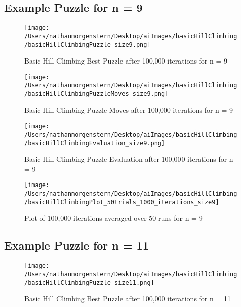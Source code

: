 \documentclass{report}
\begin{document}
\subsection{Example Puzzle for n = 9}
	
	\begin{figure}[H]
	\centering
	\texttt{[image: /Users/nathanmorgenstern/Desktop/aiImages/basicHillClimbing/basicHillClimbingPuzzle\_size9.png]}
	\caption{Basic Hill Climbing Best Puzzle after 100,000 iterations for n = 9} 
	\label{fig: Basic Hill Climbing Best Puzzle after 100,000 iterations for n = 9}
	\end{figure}
	
	\begin{figure}[H]
	\centering
	\texttt{[image: /Users/nathanmorgenstern/Desktop/aiImages/basicHillClimbing/basicHillClimbingPuzzleMoves\_size9.png]}
	\caption{Basic Hill Climbing Puzzle Moves  after 100,000 iterations for n = 9} 
	\label{fig: Basic Hill Climbing Puzzle Moves after 100,000 iterations for n = 9}
	\end{figure}

	\begin{figure}[H]
	\centering
	\texttt{[image: /Users/nathanmorgenstern/Desktop/aiImages/basicHillClimbing/basicHillClimbingEvaluation\_size9.png]}
	\caption{Basic Hill Climbing Puzzle Evaluation after 100,000 iterations for n = 9} 
	\label{fig: Basic Hill Climbing Puzzle Evaluation after 100,000 iterations for n = 9}
	\end{figure}
	
	\begin{figure}[H]
	\centering
	\texttt{[image: /Users/nathanmorgenstern/Desktop/aiImages/basicHillClimbing/basicHillClimbingPlot\_50trials\_1000\_iterations\_size9]}
	\caption{Plot of 100,000 iterations averaged over 50 runs for n = 9}
	\label{fig: Plot of 100,000 iterations averaged over 50 runs for n = 9}
	\end{figure}
	
\subsection{Example Puzzle for n = 11}

	\begin{figure}[H]
	\centering
	\texttt{[image: /Users/nathanmorgenstern/Desktop/aiImages/basicHillClimbing/basicHillClimbingPuzzle\_size11.png]}
	\caption{Basic Hill Climbing Best Puzzle after 100,000 iterations for n = 11} 
	\label{fig: Basic Hill Climbing Best Puzzle after 100,000 iterations for n = 11}
	\end{figure}
	
\end{document}
